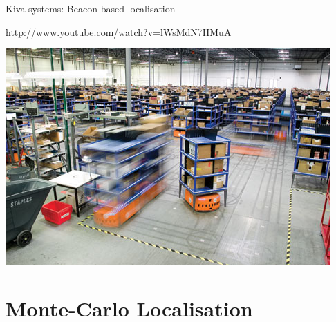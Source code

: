 \documentclass[compress]{beamer}
\begin{document}
\begin{frame}{Kiva systems: Beacon based localisation}
    \begin{center}
        \url{http://www.youtube.com/watch?v=lWsMdN7HMuA}

        \includegraphics[width=0.8\linewidth]{kiva}
    \end{center}
\end{frame}

\section{Monte-Carlo Localisation}
\end{document}
